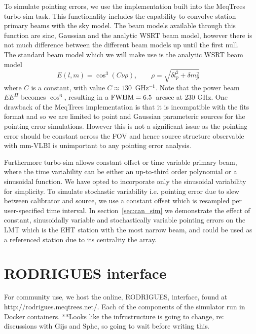 To simulate pointing errors, we use the implementation built into the {\sc MeqTrees} turbo-sim task. This functionality includes the capability to convolve station primary beams with the sky model. The beam models available through this function are sinc, Gaussian and the analytic WSRT beam model, however there is not much difference between the different beam models up until the first null. The standard beam model which we will make use  is the analytic WSRT beam model \citep{Popping_2008} 
\begin{equation}
E(l, m) = \cos^3(C\nu \rho),\qquad   \rho = \sqrt{\delta l_p^2 + \delta m_p^2}
\end{equation}
where $C$ is a constant, with value $C \approx 130$~GHz$^{-1}$. Note that the power beam $EE^H$ becomes $\cos^6$, resulting in a $\rm{FWHM} = 6.5 $~arcsec at 230 GHz.  One drawback of the {\sc MeqTrees} implementation is that it is incompatible with the {\sc fits} format and so we are limited to point and Gaussian parameteric sources for the pointing error simulations. However this is not a significant issue as the pointing error should be constant across the FOV and hence source structure observable with mm-VLBI is unimportant to any pointing error analysis.

Furthermore turbo-sim allows constant offset or time variable primary beam, where the time variability can be either an up-to-third order polynomial or a sinusoidal function. We have opted to incorporate only the sinusoidal variability for simplicity. To simulate stochastic variability i.e. pointing error due to slew between calibrator and source, we use a constant offset which is resampled per user-specified time interval. In section~\ref{sec:can_sim} we demonstrate the effect of constant, sinusoidally variable and stochastically variable pointing errors on the LMT which is the EHT station with the most narrow beam, and could be used as a referenced station due to its centrality the array.


\section{RODRIGUES interface}
For community use, we host the online, RODRIGUES, interface, found at http://rodrigues.meqtrees.net/. Each of the components of the simulator run in Docker containers. **Looks like the infrustructure is going to change, re: discussions with Gijs and Sphe, so going to wait before writing this.

